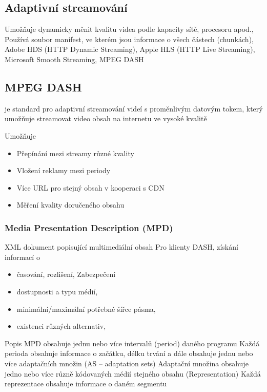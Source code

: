 \subsection{Adaptivní streamování}
Umožňuje dynamicky měnit kvalitu videa podle kapacity sítě, procesoru apod., Používá soubor manifest, ve kterém jsou informace o všech částech (chunkách), Adobe HDS (HTTP Dynamic Streaming), Apple HLS (HTTP Live Streaming), Microsoft
Smooth Streaming, MPEG DASH

\subsection{MPEG DASH}
je standard pro adaptivní streamování videí s proměnlivým datovým tokem, který umožňuje streamovat video obsah na internetu ve vysoké kvalitě

Umožňuje
\begin{itemize}
    \item Přepínání mezi streamy různé kvality
\item Vložení reklamy mezi periody
\item Více URL pro stejný obsah v kooperaci s CDN
\item Měření kvality doručeného obsahu
\end{itemize}

\subsubsection{Media Presentation Description (MPD)}
XML dokument popisující multimediální obsah
Pro klienty DASH, získání informací o
\begin{itemize}
    \item časování, rozlišení, Zabezpečení
\item dostupnosti  a typu médií,
\item minimální/maximální potřebné šířce pásma,
\item existenci různých alternativ,
\end{itemize}
Popis MPD obsahuje jednu nebo více intervalů (period) daného programu \newline
Každá perioda obsahuje informace o začátku, délku trvání a dále obsahuje
jednu nebo více adaptačních množin (AS – adaptation sets) \newline
Adaptační množina obsahuje jedno nebo více různě kódovaných médií
stejného obsahu (Representation) \newline
Každá reprezentace obsahuje informace o daném segmentu

